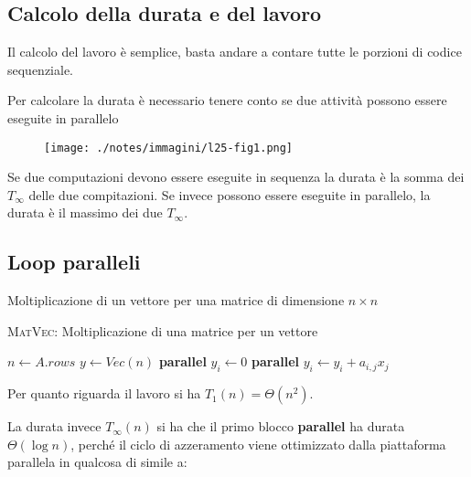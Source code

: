 
\subsection{Calcolo della durata e del lavoro}\label{calcolo-della-durata-e-del-lavoro}

Il calcolo del lavoro è semplice, basta andare a contare tutte le porzioni di codice sequenziale.

Per calcolare la durata è necessario tenere conto se due attività possono essere eseguite in parallelo

\begin{figure}[htbp]
\centering
\texttt{[image: ./notes/immagini/l25-fig1.png]}
\caption{}
\end{figure}

Se due computazioni devono essere eseguite in sequenza la durata è la somma dei $T_\infty$ delle due compitazioni. Se invece possono essere eseguite in parallelo, la durata è il massimo dei due $T_\infty$.

\subsection{Loop paralleli}\label{loop-paralleli}

Moltiplicazione di un vettore per una matrice di dimensione $n \times n$

\begin{breakablealgorithm}
	\caption{\textsc{MatVec}: Moltiplicazione di una matrice per un vettore}
	\begin{algorithmic}[1]
    \State $n \gets A.rows$
    \State $y\gets Vec(n)$
    \State \textbf{parallel}
        \State $y_i \gets 0$
    \EndFor
    \State \textbf{parallel}
            \State $y_i \gets y_i + a_{i,j}x_j$
        \EndFor
    \EndFor
\EndFunction
\end{algorithmic}
\end{breakablealgorithm}


Per quanto riguarda il lavoro si ha $T_1(n) = \Theta(n^2)$.

La durata invece $T_\infty(n)$ si ha che il primo blocco \textbf{parallel} ha durata $\Theta(\log n )$, perché il ciclo di azzeramento viene ottimizzato dalla piattaforma parallela in qualcosa di simile a:

